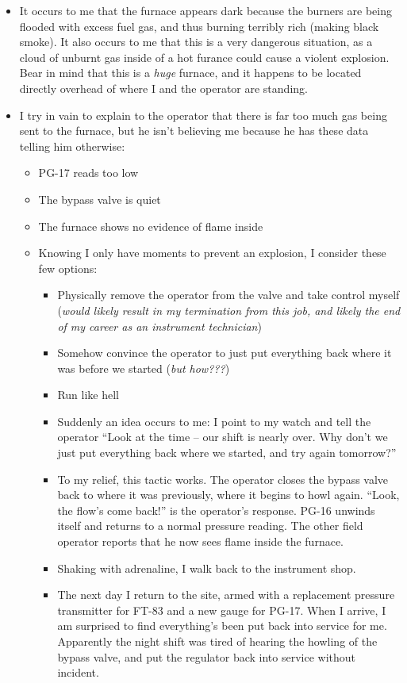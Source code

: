 \begin{itemize}
\vskip 10pt
\item{} It occurs to me that the furnace appears dark because the burners are being flooded with excess fuel gas, and thus burning terribly rich (making black smoke).  It also occurs to me that this is a very dangerous situation, as a cloud of unburnt gas inside of a hot furance could cause a violent explosion.  Bear in mind that this is a {\it huge} furnace, and it happens to be located directly overhead of where I and the operator are standing.
\vskip 10pt
\item{} I try in vain to explain to the operator that there is far too much gas being sent to the furnace, but he isn't believing me because he has these data telling him otherwise:
\begin{itemize}

\item{} PG-17 reads too low
\item{} The bypass valve is quiet
\item{} The furnace shows no evidence of flame inside
\vskip 10pt
\item{} Knowing I only have moments to prevent an explosion, I consider these few options:
\begin{itemize}

\item{} Physically remove the operator from the valve and take control myself ({\it would likely result in my termination from this job, and likely the end of my career as an instrument technician})
\item{} Somehow convince the operator to just put everything back where it was before we started ({\it but how???})
\item{} Run like hell
\vskip 10pt
\item{} Suddenly an idea occurs to me: I point to my watch and tell the operator ``Look at the time -- our shift is nearly over.  Why don't we just put everything back where we started, and try again tomorrow?''
\vskip 10pt
\item{} To my relief, this tactic works.  The operator closes the bypass valve back to where it was previously, where it begins to howl again.  ``Look, the flow's come back!'' is the operator's response.  PG-16 unwinds itself and returns to a normal pressure reading.  The other field operator reports that he now sees flame inside the furnace.
\vskip 10pt
\item{} Shaking with adrenaline, I walk back to the instrument shop.
\vskip 10pt
\item{} The next day I return to the site, armed with a replacement pressure transmitter for FT-83 and a new gauge for PG-17.  When I arrive, I am surprised to find everything's been put back into service for me.  Apparently the night shift was tired of hearing the howling of the bypass valve, and put the regulator back into service without incident.
\end{itemize}


\end{itemize}
\end{itemize}
